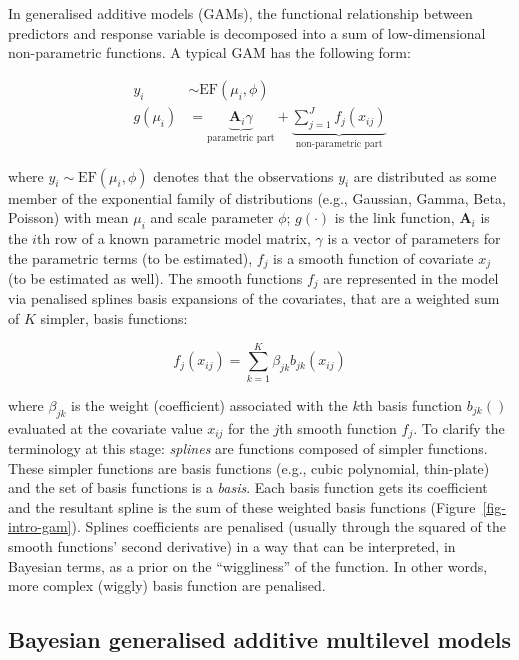 \documentclass[
  man,
  floatsintext,
  longtable,
  a4paper,
  nolmodern,
  notxfonts,
  notimes,
  colorlinks=true,linkcolor=blue,citecolor=blue,urlcolor=blue]{apa7}
\begin{document}
In generalised additive models (GAMs), the functional relationship
between predictors and response variable is decomposed into a sum of
low-dimensional non-parametric functions. A typical GAM has the
following form:

\[
\begin{aligned} 
y_{i} &\sim \mathrm{EF}\left(\mu_{i}, \phi\right)\\
g\left(\mu_i\right) &= \underbrace{\mathbf{A}_{i} \gamma}_{\text{parametric part}} + \underbrace{\sum_{j=1}^{J} f_{j}\left(x_{ij}\right)}_{\text{non-parametric part}}
\end{aligned}
\]

where \(y_{i} \sim \mathrm{EF}\left(\mu_{i}, \phi\right)\) denotes that
the observations \(y_{i}\) are distributed as some member of the
exponential family of distributions (e.g., Gaussian, Gamma, Beta,
Poisson) with mean \(\mu_{i}\) and scale parameter \(\phi\);
\(g(\cdot)\) is the link function, \(\mathbf{A}_{i}\) is the \(i\)th row
of a known parametric model matrix, \(\gamma\) is a vector of parameters
for the parametric terms (to be estimated), \(f_{j}\) is a smooth
function of covariate \(x_{j}\) (to be estimated as well). The smooth
functions \(f_{j}\) are represented in the model via penalised splines
basis expansions of the covariates, that are a weighted sum of \(K\)
simpler, basis functions:

\[
f_{j}\left(x_{i j}\right) = \sum_{k=1}^K \beta_{jk} b_{jk}\left(x_{ij}\right)
\]

where \(\beta_{jk}\) is the weight (coefficient) associated with the
\(k\)th basis function \(b_{jk}()\) evaluated at the covariate value
\(x_{ij}\) for the \(j\)th smooth function \(f_{j}\). To clarify the
terminology at this stage: \emph{splines} are functions composed of
simpler functions. These simpler functions are basis functions (e.g.,
cubic polynomial, thin-plate) and the set of basis functions is a
\emph{basis}. Each basis function gets its coefficient and the resultant
spline is the sum of these weighted basis functions
(Figure~\ref{fig-intro-gam}). Splines coefficients are penalised
(usually through the squared of the smooth functions' second derivative)
in a way that can be interpreted, in Bayesian terms, as a prior on the
``wiggliness'' of the function. In other words, more complex (wiggly)
basis function are penalised.

\subsection{Bayesian generalised additive multilevel
models}\label{bayesian-generalised-additive-multilevel-models}
\end{document}
